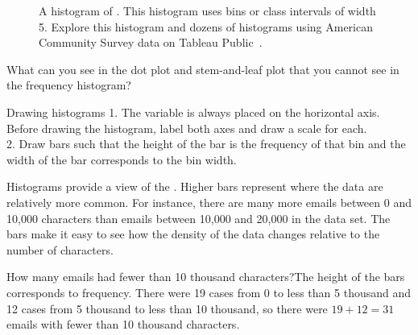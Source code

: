 \begin{figure}[bth]
   \centering
   \caption{A histogram of . This histogram uses bins or class intervals of width 5.  Explore this histogram and dozens of histograms using American Community Survey data on Tableau Public~.}
   \label{email50NumCharHist}
\end{figure}

\begin{exercisewrap}
\begin{nexercise}
What can you see in the dot plot and stem-and-leaf plot that you cannot see in the frequency histogram?\footnotemark
\end{nexercise}
\end{exercisewrap}

\begin{onebox}{Drawing histograms}
1. The variable is always placed on the horizontal axis. Before drawing the histogram, label both axes and draw a scale for each. \\[2mm]
2. Draw bars such that the height of the bar is the frequency of that bin and the width of the bar corresponds to the bin width.\end{onebox}

Histograms provide a view of the . Higher bars represent where the data are relatively more common. For instance, there are many more emails between 0 and 10,000 characters than emails between 10,000 and 20,000 in the data set. The bars make it easy to see how the density of the data changes relative to the number of characters.

\begin{examplewrap}
\begin{nexample}{How many emails had fewer than 10 thousand characters?}The height of the bars corresponds to frequency. There were 19 cases from 0 to less than 5 thousand and 12 cases from 5 thousand to less than 10 thousand, so there were $19+12=31$ emails with fewer than 10 thousand characters.
\end{nexample}
\end{examplewrap}


